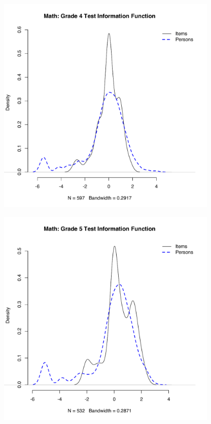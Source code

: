 \documentclass[]{article}
\begin{document}
\begin{figure}
\centering
\includegraphics[height=4.16667in]{ipdens/math4ipdens.pdf}
\caption{}
\end{figure}

\begin{figure}
\centering
\includegraphics[height=4.16667in]{ipdens/math5ipdens.pdf}
\caption{}
\end{figure}
\end{document}
